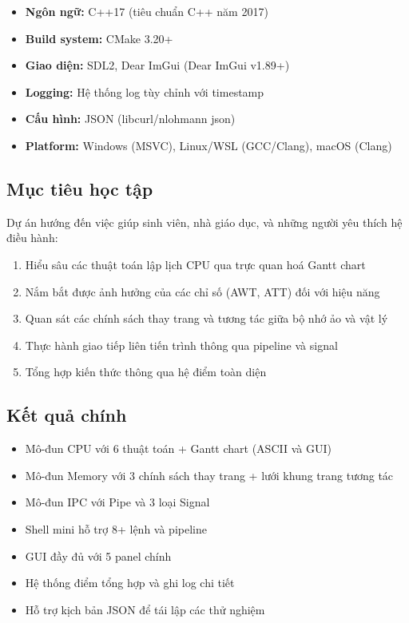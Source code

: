 \begin{itemize}[leftmargin=1.5cm]
  \item \textbf{Ngôn ngữ:} C++17 (tiêu chuẩn C++ năm 2017)
  \item \textbf{Build system:} CMake 3.20+
  \item \textbf{Giao diện:} SDL2, Dear ImGui (Dear ImGui v1.89+)
  \item \textbf{Logging:} Hệ thống log tùy chỉnh với timestamp
  \item \textbf{Cấu hình:} JSON (libcurl/nlohmann json)
  \item \textbf{Platform:} Windows (MSVC), Linux/WSL (GCC/Clang), macOS (Clang)
\end{itemize}

\subsection*{Mục tiêu học tập}

Dự án hướng đến việc giúp sinh viên, nhà giáo dục, và những người yêu thích hệ điều hành:
\begin{enumerate}[leftmargin=1.5cm]
  \item Hiểu sâu các thuật toán lập lịch CPU qua trực quan hoá Gantt chart
  \item Nắm bắt được ảnh hưởng của các chỉ số (AWT, ATT) đối với hiệu năng
  \item Quan sát các chính sách thay trang và tương tác giữa bộ nhớ ảo và vật lý
  \item Thực hành giao tiếp liên tiến trình thông qua pipeline và signal
  \item Tổng hợp kiến thức thông qua hệ điểm toàn diện

\end{enumerate}

\subsection*{Kết quả chính}

\begin{itemize}[leftmargin=1.5cm]
  \item Mô-đun CPU với 6 thuật toán + Gantt chart (ASCII và GUI)
  \item Mô-đun Memory với 3 chính sách thay trang + lưới khung trang tương tác
  \item Mô-đun IPC với Pipe và 3 loại Signal
  \item Shell mini hỗ trợ 8+ lệnh và pipeline
  \item GUI đầy đủ với 5 panel chính
  \item Hệ thống điểm tổng hợp và ghi log chi tiết
  \item Hỗ trợ kịch bản JSON để tái lập các thử nghiệm
\end{itemize}

